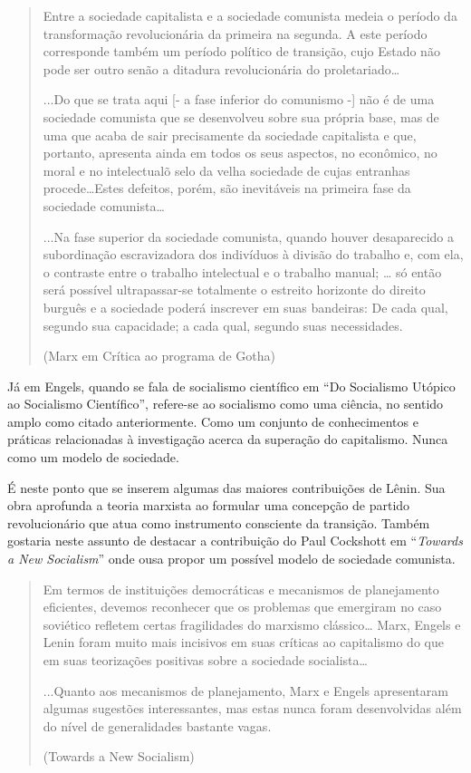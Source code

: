 \begin{quote}
Entre a sociedade capitalista e a sociedade comunista medeia o período da transformação revolucionária da primeira na segunda. A este período corresponde também um período político de transição, cujo Estado não pode ser outro senão a ditadura revolucionária do proletariado…

...Do que se trata aqui [- a fase inferior do comunismo -] não é de uma sociedade comunista que se desenvolveu sobre sua própria base, mas de uma que acaba de sair precisamente da sociedade capitalista e que, portanto, apresenta ainda em todos os seus aspectos, no econômico, no moral e no intelectual\~ o selo da velha sociedade de cujas entranhas procede…Estes defeitos, porém, são inevitáveis na primeira fase da sociedade comunista…

...Na fase superior da sociedade comunista, quando houver desaparecido a subordinação escravizadora dos indivíduos à divisão do trabalho e, com ela, o contraste entre o trabalho intelectual e o trabalho manual; … só então será possível ultrapassar-se totalmente o estreito horizonte do direito burguês e a sociedade poderá inscrever em suas bandeiras: De cada qual, segundo sua capacidade; a cada qual, segundo suas necessidades.

(Marx em Crítica ao programa de Gotha)
\end{quote}
Já em Engels, quando se fala de socialismo científico em “Do Socialismo Utópico ao Socialismo Científico”, refere-se ao socialismo como uma ciência, no sentido amplo como citado anteriormente. Como um conjunto de conhecimentos e práticas relacionadas à investigação acerca da superação do capitalismo. Nunca como um modelo de sociedade.

É neste ponto que se inserem algumas das maiores contribuições de Lênin. Sua obra aprofunda a teoria marxista ao formular uma concepção de partido revolucionário que atua como instrumento consciente da transição. Também gostaria neste assunto de destacar a contribuição do Paul Cockshott em “\textit{Towards a New Socialism}” onde ousa propor um possível modelo de sociedade comunista.

\begin{quote}
Em termos de instituições democráticas e mecanismos de planejamento eficientes, devemos reconhecer que os problemas que emergiram no caso soviético refletem certas fragilidades do marxismo clássico… Marx, Engels e Lenin foram muito mais incisivos em suas críticas ao capitalismo do que em suas teorizações positivas sobre a sociedade socialista…

...Quanto aos mecanismos de planejamento, Marx e Engels apresentaram algumas sugestões interessantes, mas estas nunca foram desenvolvidas além do nível de generalidades bastante vagas.

(Towards a New Socialism)
\end{quote}

